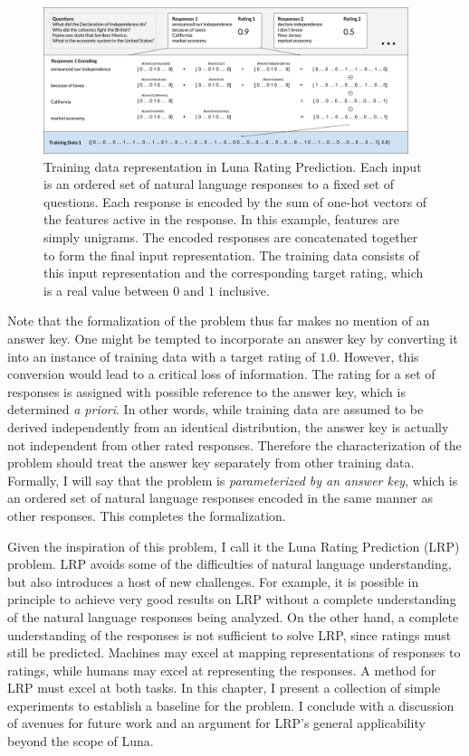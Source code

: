 \begin{figure}[h]
\centerline{%
\includegraphics[width=0.95\textwidth]{figures/lrpformalization.png}%
}%
\caption{Training data representation in Luna Rating Prediction. Each input is an ordered set of natural language responses to a fixed set of questions. Each response is encoded by the sum of one-hot vectors of the features active in the response. In this example, features are simply unigrams. The encoded responses are concatenated together to form the final input representation. The training data consists of this input representation and the corresponding target rating, which is a real value between $0$ and $1$ inclusive.}
\label{fig:lrpformalization}
\end{figure}

Note that the formalization of the problem thus far makes no mention of an answer key. One might be tempted to incorporate an answer key by converting it into an instance of training data with a target rating of $1.0$. However, this conversion would lead to a critical loss of information. The rating for a set of responses is assigned with possible reference to the answer key, which is determined \textit{a priori}. In other words, while training data are assumed to be derived independently from an identical distribution, the answer key is actually not independent from other rated responses. Therefore the characterization of the problem should treat the answer key separately from other training data. Formally, I will say that the problem is \textit{parameterized by an answer key}, which is an ordered set of natural language responses encoded in the same manner as other responses. This completes the formalization.

Given the inspiration of this problem, I call it the Luna Rating Prediction (LRP) problem. LRP avoids some of the difficulties of natural language understanding, but also introduces a host of new challenges. For example, it is possible in principle to achieve very good results on LRP without a complete understanding of the natural language responses being analyzed. On the other hand, a complete understanding of the responses is not sufficient to solve LRP, since ratings must still be predicted. Machines may excel at mapping representations of responses to ratings, while humans may excel at representing the responses. A method for LRP must excel at both tasks. In this chapter, I present a collection of simple experiments to establish a baseline for the problem. I conclude with a discussion of avenues for future work and an argument for LRP's general applicability beyond the scope of Luna.

